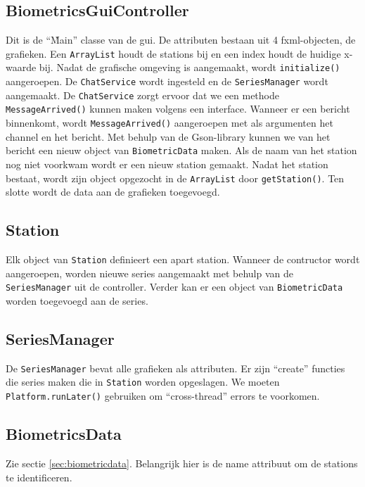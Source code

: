 \documentclass[a4paper]{report}
\newcommand{\code}[1]{\colorbox{light-gray}{\texttt{#1}}}
\begin{document}
        \subsection{BiometricsGuiController}
            Dit is de ``M̀ain'' classe van de gui.
            De attributen bestaan uit 4 fxml-objecten, de grafieken.
            Een \code{ArrayList} houdt de stations bij en een index houdt de huidige x-waarde bij.
            Nadat de grafische omgeving is aangemaakt, wordt \code{initialize()} aangeroepen.
            De \code{ChatService} wordt ingesteld en de \code{SeriesManager} wordt aangemaakt.
            De \code{ChatService} zorgt ervoor dat we een methode \code{MessageArrived()} kunnen maken volgens een interface.
            Wanneer er een bericht binnenkomt, wordt \code{MessageArrived()} aangeroepen met als argumenten het channel en het bericht.
            Met behulp van de Gson-library kunnen we van het bericht een nieuw object van \code{BiometricData} maken.
            Als de naam van het station nog niet voorkwam wordt er een nieuw station gemaakt.
            Nadat het station bestaat, wordt zijn object opgezocht in de \code{ArrayList} door \code{getStation()}.
            Ten slotte wordt de data aan de grafieken toegevoegd.
            
        \subsection{Station}
            Elk object van \code{Station} definieert een apart station.
            Wanneer de contructor wordt aangeroepen, worden nieuwe series aangemaakt met behulp van de \code{SeriesManager} uit de controller.
            Verder kan er een object van \code{BiometricData} worden toegevoegd aan de series.

        \subsection{SeriesManager}
            De \code{SeriesManager} bevat alle grafieken als attributen.
            Er zijn ``create'' functies die series maken die in \code{Station} worden opgeslagen.
            We moeten \code{Platform.runLater()} gebruiken om ``cross-thread'' errors te voorkomen.

        \subsection{BiometricsData}
            Zie sectie \ref{sec:biometricdata}.
            Belangrijk hier is de name attribuut om de stations te identificeren.
\end{document}
